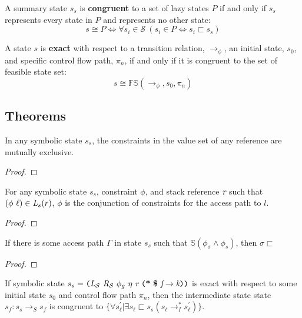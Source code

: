 \begin{definition}
\label{congruent}
A summary state $s_s$ is \textbf{congruent} to a set of lazy states $P$ if and only if $s_s$ represents every state in $P$ and represents no other state: 
$$s \cong P \Leftrightarrow \forall s_i \in \mathcal{S}\ (s_i \in P \Leftrightarrow s_i \sqsubset s_s) $$
\end{definition}

\begin{definition}
\label{exact}
A state $s$ is \textbf{exact} with respect to a transition relation, $\rightarrow_\phi$, an initial state, $s_0$, and specific control flow path, $\pi_n$, if and only if it is congruent to the set of feasible state set:
$$ s \cong \mathbb{FS}(\rightarrow_{\phi},s_0,\pi_n)$$
\end{definition}

\subsection{Theorems}

\begin{theorem}
\label{thm:mutex}
In any symbolic state $s_s$, the constraints in the value set of any reference are mutually exclusive.
\end{theorem}
\begin{proof}
\end{proof}

\begin{lemma}
For any symbolic state $s_s$, constraint $\phi$, and stack reference $\emph{r}$ such that $(\phi\ \ell) \in \emph{L}_s (r)$, $\phi$ is the conjunction of constraints for the access path to $l$.
\end{lemma}
\begin{proof}
\end{proof}

\begin{lemma}
If there is some access path $\Gamma$ in state $s_s$ such that $\mathbb{S}(\phi_\sigma \wedge \phi_s)$, then $\sigma \sqsubset$  
\end{lemma}
\begin{proof}
\end{proof}

\begin{lemma}
\label{lem:init}
If symbolic state $s_s = \lp \cfgnt{L}_{\mathcal{S}}\ \cfgnt{R}_{\mathcal{S}}\ \phi_g\ \eta\ \cfgnt{r}\ \lp \cfgt{*}\ \cfgt{\$}\ \cfgnt{f} \rightarrow \cfgnt{k}\rp \rp$ is exact with respect to some initial state $s_0$ and control flow path $\pi_n$, then the intermediate state state $s_f : s_s \rightarrow_S s_f$ is congruent to $\{\forall s_\ell^\prime | \exists s_\ell \sqsubset s_s (s_\ell \rightarrow_I^* s_\ell^\prime)  \}$.
\end{lemma}

